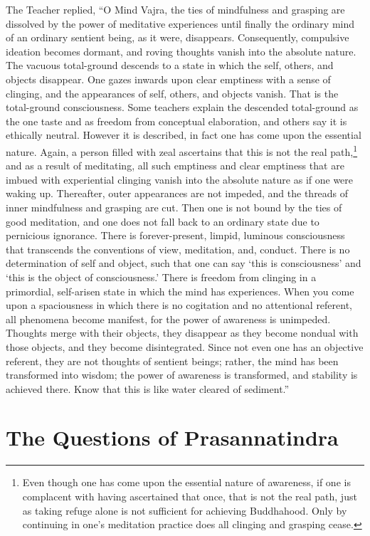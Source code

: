 \documentclass[a4paper,11pt,twoside,final]{book}
\begin{document}
The Teacher replied, ``O Mind Vajra, the ties of mindfulness and
grasping are dissolved by the power of meditative experiences until
finally the ordinary mind of an ordinary sentient being, as it were,
disappears. Consequently, compulsive ideation becomes dormant, and
roving thoughts vanish into the absolute nature. The vacuous
total-ground descends to a state in which the self, others, and
objects disappear. One gazes inwards upon clear emptiness with a sense
of clinging, and the appearances of self, others, and objects
vanish. That is the total-ground consciousness. Some teachers explain
the descended total-ground as the one taste and as freedom from
conceptual elaboration, and others say it is ethically
neutral. However it is described, in fact one has come upon the
essential nature.  Again, a person filled with zeal ascertains that
this is not the real path,\footnote{Even though one has come upon the
  essential nature of awareness, if one is complacent with having
  ascertained that once, that is not the real path, just as taking
  refuge alone is not sufficient for achieving Buddhahood. Only by
  continuing in one's meditation practice does all clinging and
  grasping cease.} and as a result of meditating, all such emptiness
and clear emptiness that are imbued with experiential clinging vanish
into the absolute nature as if one were waking up. Thereafter, outer
appearances are not impeded, and the threads of inner mindfulness and
grasping are cut. Then one is not bound by the ties of good
meditation, and one does not fall back to an ordinary state due to
pernicious ignorance. There is forever-present, limpid, luminous
consciousness that transcends the conventions of view, meditation,
and, conduct. There is no determination of self and object, such that
one can say `this is consciousness' and `this is the object of
consciousness.' There is freedom from clinging in a primordial,
self-arisen state in which the mind has experiences. When you come
upon a spaciousness in which there is no cogitation and no attentional
referent, all phenomena become manifest, for the power of awareness is
unimpeded. Thoughts merge with their objects, they disappear as they
become nondual with those objects, and they become
disintegrated. Since not even one has an objective referent, they are
not thoughts of sentient beings; rather, the mind has been transformed
into wisdom; the power of awareness is transformed, and stability is
achieved there. Know that this is like water cleared of sediment.''

\section{The Questions of Prasannatindra}
\end{document}
